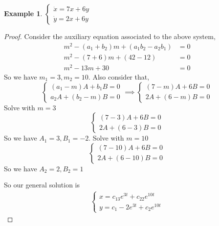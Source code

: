 \documentclass[oneside,11pt,pdftex,final]{book}%
\numberwithin{equation}{section}
\newtheorem{example}[theorem]{Example}
\numberwithin{section}{chapter}
\numberwithin{equation}{chapter}
\begin{document}
\begin{example}
$ \begin{cases}
	\dot{x}=7x+6y\\
	\dot{y}=2x+6y
\end{cases} $
\end{example}
\begin{proof}
Consider the auxiliary equation associated to the above system,
\begin{align*}
	m^2-(a_1+b_2)m+(a_1b_2-a_2b_1)&=0\\
	m^2-(7+6)m+(42-12)&=0\\
	m^2-13m+30&=0
\end{align*}
So we have $ m_1=3,m_2=10 $.
Also consider that,
\[ \begin{cases}
	(a_1-m)A+b_1B=0\\
	a_2A+(b_2-m)B=0
\end{cases} \implies 
\begin{cases}
	(7-m)A+6B=0\\
	2A+(6-m)B=0
\end{cases}\]
Solve with $ m=3 $
\[ \begin{cases}
	(7-3)A+6B=0\\
	2A+(6-3)B=0
\end{cases} \]
So we have $ A_1=3, B_1=-2 $. Solve with $ m=10 $
\[ \begin{cases}
	(7-10)A+6B=0\\
	2A+(6-10)B=0
\end{cases} \]
So we have $ A_2=2, B_2=1 $

So our general solution is
\begin{align*}
	\begin{cases}
		x=c_13e^{3t}+c_22e^{10t}\\
		y=c_1-2e^{3t}+c_2e^{10t}
	\end{cases}
\end{align*}
\end{proof}
\end{document}
